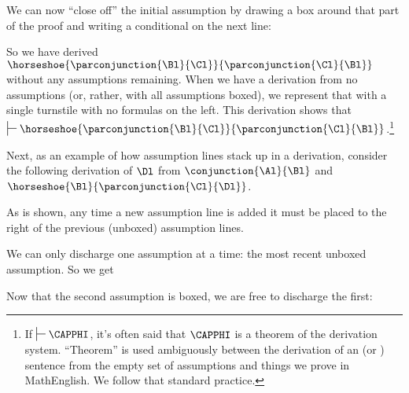 We can now ``close off'' the initial assumption by drawing a box around that part of the proof and writing a conditional on the next line:
\begin{gproof}[\label{simpleconjunctionclosed}]
\end{gproof}
\noindent{}So we have derived $\horseshoe{\parconjunction{\Bl}{\Cl}}{\parconjunction{\Cl}{\Bl}}$ without any assumptions remaining.
When we have a derivation from no assumptions (or, rather, with all assumptions boxed), we represent that with a single turnstile with no formulas on the left.
This derivation shows that $\sststile{}{}\horseshoe{\parconjunction{\Bl}{\Cl}}{\parconjunction{\Cl}{\Bl}}$.\footnote{If $\sststile{}{}\CAPPHI$, it's often said that $\CAPPHI$ is a theorem of the derivation system.
``Theorem'' is used ambiguously between the derivation of an \GSL (or \GQL) sentence from the empty set of assumptions and things we prove in MathEnglish.
We follow that standard practice.}

Next, as an example of how assumption lines stack up in a derivation, consider the following derivation of $\Dl$ from $\conjunction{\Al}{\Bl}$ and $\horseshoe{\Bl}{\parconjunction{\Cl}{\Dl}}$.
\begin{gproof}[\label{secondexample}]
\end{gproof}
\noindent{}As is shown, any time a new assumption line is added it must be placed to the right of the previous (unboxed) assumption lines.

We can only discharge one assumption at a time: the most recent unboxed assumption.
So we get

\begin{gproof}
\end{gproof}
\noindent{}Now that the second assumption is boxed, we are free to discharge the first:

